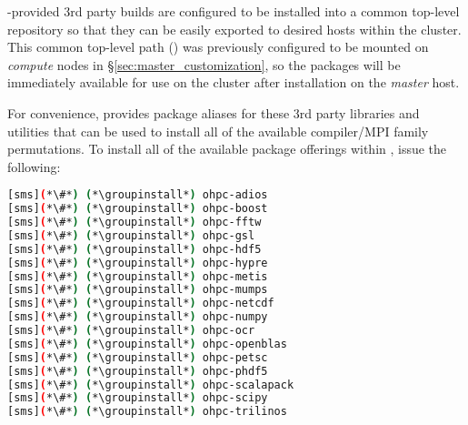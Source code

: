 \begin{center}
\begin{tcolorbox}[]
\small
\OHPC{}-provided 3rd party builds are configured to be installed
into a common top-level repository so that they can be easily exported to
desired hosts within the cluster. This common top-level path
() was previously configured to be mounted on {\em
 compute} nodes in \S\ref{sec:master_customization}, so the packages will be
immediately available for use on the cluster after installation on the {\em
 master} host.
\end{tcolorbox}
\end{center}

For convenience, \OHPC{} provides package aliases for these 3rd
party libraries and utilities that can be used to install all of the available
compiler/MPI family permutations. To install all of the available package
offerings within \OHPC{}, issue the following:

\begin{lstlisting}[language=bash,keywords={},upquote=true,keepspaces]
[sms](*\#*) (*\groupinstall*) ohpc-adios        
[sms](*\#*) (*\groupinstall*) ohpc-boost        
[sms](*\#*) (*\groupinstall*) ohpc-fftw         
[sms](*\#*) (*\groupinstall*) ohpc-gsl          
[sms](*\#*) (*\groupinstall*) ohpc-hdf5         
[sms](*\#*) (*\groupinstall*) ohpc-hypre        
[sms](*\#*) (*\groupinstall*) ohpc-metis        
[sms](*\#*) (*\groupinstall*) ohpc-mumps        
[sms](*\#*) (*\groupinstall*) ohpc-netcdf       
[sms](*\#*) (*\groupinstall*) ohpc-numpy        
[sms](*\#*) (*\groupinstall*) ohpc-ocr
[sms](*\#*) (*\groupinstall*) ohpc-openblas     
[sms](*\#*) (*\groupinstall*) ohpc-petsc        
[sms](*\#*) (*\groupinstall*) ohpc-phdf5        
[sms](*\#*) (*\groupinstall*) ohpc-scalapack    
[sms](*\#*) (*\groupinstall*) ohpc-scipy        
[sms](*\#*) (*\groupinstall*) ohpc-trilinos     
\end{lstlisting}

